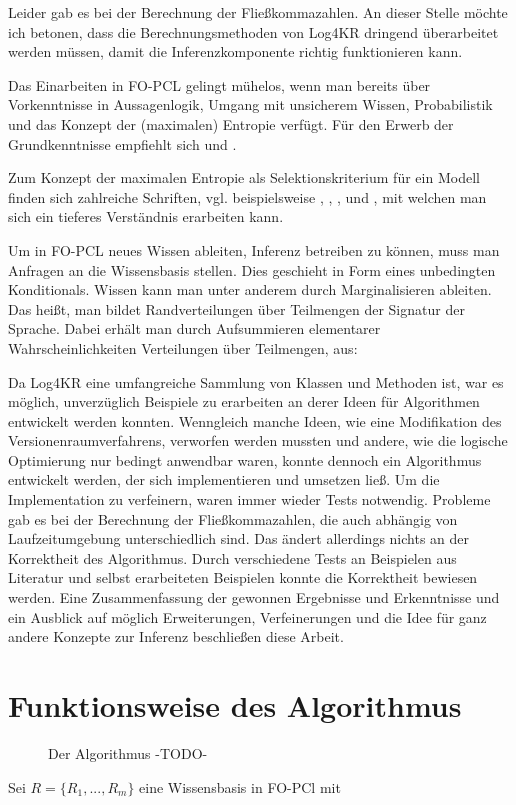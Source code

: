 \documentclass[a4paper, 11pt]{book}
\begin{document}
Leider gab es bei der Berechnung der Fließkommazahlen. An dieser Stelle möchte ich betonen, dass die Berechnungsmethoden von Log4KR dringend überarbeitet werden müssen, damit die Inferenzkomponente richtig funktionieren kann.

Das Einarbeiten in FO-PCL gelingt mühelos, wenn man bereits über Vorkenntnisse in Aussagenlogik, Umgang mit unsicherem Wissen, Probabilistik  und das Konzept der (maximalen) Entropie verfügt. Für den Erwerb der Grundkenntnisse empfiehlt sich \cite{BKI08} und \cite{KK06}.

Zum Konzept der maximalen Entropie als Selektionskriterium für ein Modell finden sich zahlreiche Schriften, vgl. beispielsweise \cite{BHM14}, \cite{BK15}, \cite{Fis10}, \cite{RKI97} und \cite{TFLKIB10}, mit welchen man sich ein tieferes Verständnis erarbeiten kann.

Um in FO-PCL neues Wissen ableiten,  Inferenz betreiben zu können, muss man Anfragen an die Wissensbasis stellen. Dies geschieht in Form eines unbedingten Konditionals. Wissen kann man unter anderem durch Marginalisieren ableiten. Das heißt, man bildet Randverteilungen über Teilmengen der Signatur der Sprache. Dabei erhält man durch Aufsummieren elementarer Wahrscheinlichkeiten Verteilungen über Teilmengen, aus: \cite[Anhang A.2]{BKI08}

Da Log4KR eine umfangreiche Sammlung von Klassen und Methoden ist, war es möglich, unverzüglich Beispiele zu erarbeiten an derer Ideen für Algorithmen entwickelt werden konnten. Wenngleich manche Ideen, wie eine Modifikation des Versionenraumverfahrens, verworfen werden mussten und andere, wie die logische Optimierung nur bedingt anwendbar waren, konnte dennoch ein Algorithmus entwickelt werden, der sich implementieren und umsetzen ließ. Um die Implementation zu verfeinern, waren immer wieder Tests notwendig. Probleme gab es bei der Berechnung der Fließkommazahlen, die auch abhängig von Laufzeitumgebung unterschiedlich sind. Das ändert allerdings nichts an der Korrektheit des Algorithmus.
Durch verschiedene Tests an Beispielen aus Literatur und selbst erarbeiteten Beispielen konnte die Korrektheit bewiesen werden.
Eine Zusammenfassung der gewonnen Ergebnisse und Erkenntnisse und ein Ausblick auf möglich Erweiterungen, Verfeinerungen und die Idee für ganz andere Konzepte zur Inferenz beschließen diese Arbeit. 



\section{Funktionsweise des Algorithmus}
\begin{figure}[h]
	
	
	
	\caption{Der Algorithmus -TODO-}
	
\end{figure}
Sei $ R = \{R_1, ..., R_m\} $ eine Wissensbasis in FO-PCl mit
\end{document}
